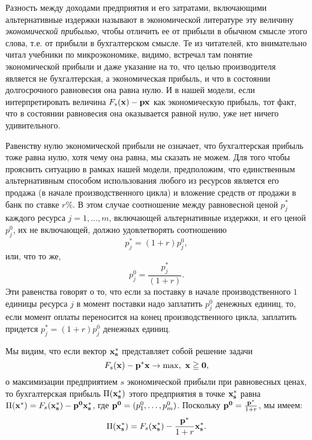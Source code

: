     Разность между доходами предприятия и его затратами,
    включающими альтернативные издержки называют в экономической
    литературе эту величину  \emph{экономической
    прибылью}, чтобы отличить ее от прибыли в обычном смысле этого
    слова, т.е. от прибыли в бухгалтерском смысле. Те из читателей,
    кто внимательно читал учебники по микроэкономике, видимо,
    встречал там понятие экономической прибыли и даже указание
    на то, что целью производителя является не бухгалтерская, а
    экономическая прибыль, и что
    в состоянии долгосрочного равновесия она равна нулю.
    И в нашей модели, если интерпретировать величина
    $F_{s}(\mathbf{x})-\mathbf{p}\mathbf{x}$ как экономическую прибыль,
    тот факт, что в состоянии равновесия она
    оказывается равной нулю, уже нет ничего удивительного.

    Равенству нулю экономической прибыли не означает, что
    бухгалтерская прибыль тоже равна нулю, хотя чему она равна, мы
    сказать не можем. Для того чтобы прояснить ситуацию в рамках нашей модели,
    предположим, что единственным альтернативным способом
    использования любого из ресурсов является его продажа (в начале производственного
    цикла) и вложение средств от продажи в банк по ставке $r\%$. В
    этом случае соотношение между равновесной ценой $p_{j}^{*}$ каждого ресурса
    $j=1,\ldots,m$, включающей альтернативные издержки, и его ценой
    $p_{j}^{0}$, их не включающей, должно удовлетворять соотношению
\[
    p_{j}^{*}=(1+r)p_{j}^{0},
\]
    или, что то же,
\[
        p_{j}^{0}=\frac{p^{*}_{j}}{(1+r)}.
\]
    Эти равенства говорят о то, что если за поставку в начале производственного $1$
    единицы ресурса $j$ в момент поставки надо заплатить $p_{j}^{0}$
    денежных единиц, то, если момент оплаты переносится на конец
    производственного цикла, заплатить придется
    $p_{j}^{*}=(1+r)p_{j}^{0}$ денежных единиц.



    Мы видим, что если вектор $\mathbf{x_{s}^{*}}$ представляет собой
    решение задачи
\[
    F_{s}(\vc{x})-\vc{p^{*}}\vc{x}\rightarrow\max, \ \vc{x}\geqq\vc{0},
\]
    о максимизации предприятием $s$ экономической прибыли при равновесных ценах,
    то бухгалтерская прибыль $\Pi(\mathbf{x_{s}^{*}})$ этого предприятия
    в точке $\mathbf{x_{s}^{*}}$ равна
$\Pi(\mathbf{x^{*}})=F_{s}(\mathbf{x_{s}^{*}})-\mathbf{p^{0}}\mathbf{x_{s}^{*}}$,
    где $\mathbf{p^{0}}=(p_{1}^{0},\ldots,p_{m}^{0})$.
    Поскольку $\mathbf{p^{0}}=\frac{\mathbf{p^{*}}}{1+r}$, мы имеем:
\[
    \Pi(\mathbf{x_{s}^{*}})=F_{s}(\mathbf{x_{s}^{*}})-\frac{\mathbf{p^{*}}}{1+r}\mathbf{x_{s}^{*}}.
\]

